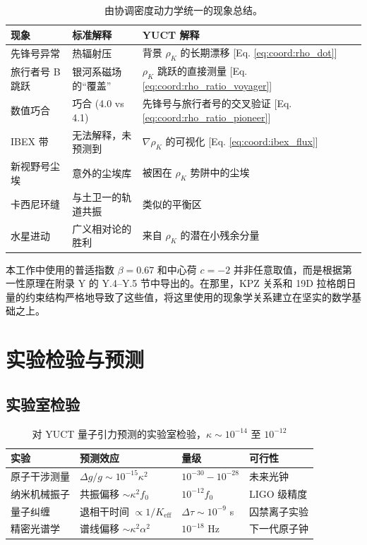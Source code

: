 \documentclass[11pt,a4paper]{article}
\theoremstyle{remark}
\newcommand{\Keff}{K_{\mathrm{eff}}}
\begin{document}
	\begin{table}[htbp]
		\centering
		\caption{由协调密度动力学统一的现象总结。}
		\label{tab:coord:summary}
		\begin{tabular}{|p{4.5cm}|p{4.5cm}|p{5cm}|}
			\hline
			\textbf{现象} & \textbf{标准解释} & \textbf{YUCT 解释} \\
			\hline
			先锋号异常 & 热辐射压 & 背景 $\rho_K$ 的长期漂移 [Eq. \ref{eq:coord:rho_dot}] \\
			\hline
			旅行者号 B 跳跃 & 银河系磁场的“覆盖” & $\rho_K$ 跳跃的直接测量 [Eq. \ref{eq:coord:rho_ratio_voyager}] \\
			\hline
			数值巧合 & 巧合 (4.0 vs 4.1) & 先锋号与旅行者号的交叉验证 [Eq. \ref{eq:coord:rho_ratio_pioneer}] \\
			\hline
			IBEX 带 & 无法解释，未预测到 & $\nabla \rho_K$ 的可视化 [Eq. \ref{eq:coord:ibex_flux}] \\
			\hline
			新视野号尘埃 & 意外的尘埃库 & 被困在 $\rho_K$ 势阱中的尘埃 \\
			\hline
			卡西尼环缝 & 与土卫一的轨道共振 & 类似的平衡区 \\
			\hline
			水星进动 & 广义相对论的胜利 & 来自 $\rho_K$ 的潜在小残余分量 \\
			\hline
		\end{tabular}
	\end{table}
	
	本工作中使用的普适指数 $\beta = 0.67$ 和中心荷 $c = -2$ 并非任意取值，而是根据第一性原理在附录 Y 的 Y.4–Y.5 节中导出的。在那里，KPZ 关系和 19D 拉格朗日量的约束结构严格地导致了这些值，将这里使用的现象学关系建立在坚实的数学基础之上。
	
	\section{实验检验与预测}
	\label{sec:experimental-tests}
	
	\subsection{实验室检验}
	
	\begin{table}[htbp]
		\centering
		\begin{tabular}{p{2.8cm}p{4.2cm}p{2.5cm}p{2.5cm}}
			\toprule
			\textbf{实验} & \textbf{预测效应} & \textbf{量级} & \textbf{可行性} \\
			\midrule
			原子干涉测量 & $\Delta g/g \sim 10^{-15}\kappa^2$ & $10^{-30} - 10^{-28}$ & 未来光钟 \\
			纳米机械振子 & 共振偏移 $\sim \kappa^2 f_0$ & $10^{-12} f_0$ & LIGO 级精度 \\
			量子纠缠 & 退相干时间 $\propto 1/\Keff$ & $\Delta\tau \sim 10^{-9}$ s & 囚禁离子实验 \\
			精密光谱学 & 谱线偏移 $\sim \kappa^2 \alpha^2$ & $10^{-18}$ Hz & 下一代原子钟 \\
			\bottomrule
		\end{tabular}
		\caption{对 YUCT 量子引力预测的实验室检验，$\kappa \sim 10^{-14}$ 至 $10^{-12}$}
		\label{tab:lab-tests}
	\end{table}
	
\end{document}
